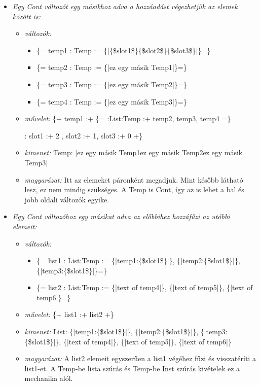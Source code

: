 {\begin{itemize}
\item \emph{ Egy Cont változót egy másikhoz adva a hozzáadást végezhetjük az elemek között is:}
\begin{itemize}
\item \emph{változók:}
\begin{itemize}
\item \{= temp1 : Temp  := \{|\{\$slot1\$\}\{\$slot2\$\}\{\$slot3\$\}|\}=\}
\item \{= temp2 : Temp  := \{|ez egy másik Temp1|\}=\}
\item \{= temp3 : Temp  := \{|ez egy másik Temp2|\}=\}
\item \{= temp4 : Temp  := \{|ez egy másik Temp3|\}=\}
\end{itemize}
\item \emph{művelet:}
\{+ temp1 :+ \{= :List:Temp :+ temp2, temp3, temp4 =\}

: slot1 :+ 2 , slot2 :+ 1, slot3 :+ 0   +\} 
\item \emph{kimenet:}
Temp: {|ez egy másik Temp1ez egy másik Temp2ez egy másik Temp3|}
\item \emph{magyarázat:}
Itt az elemeket páronként megadjuk.
Mint később látható lesz, ez nem mindig szükséges.
A Temp is Cont, így az is lehet a bal és jobb oldali változók egyike.
\end{itemize}

\item \emph{ Egy Cont változóhoz egy másikat adva az előbbihez hozzáfűzi az utóbbi elemeit:}
\begin{itemize}
\item \emph{változók:}
\begin{itemize}
\item \{= list1 : List:Temp  := \{|temp1:\{\$slot1\$\}|\}, \{|temp2:\{\$slot1\$\}|\}, \{|temp3:\{\$slot1\$\}|\}=\}
\item \{= list2 : List:Temp  := \{|text of temp4|\}, \{|text of temp5|\}, \{|text of temp6|\}=\}
\end{itemize}
\item \emph{művelet:}
\{+ list1 :+ list2 +\}
\item \emph{kimenet:}
List: \{|temp1:\{\$slot1\$\}|\}, \{|temp2:\{\$slot1\$\}|\}, \{|temp3:\{\$slot1\$\}|\}, \{|text of temp4|\}, \{|text of temp5|\}, \{|text of temp6|\}
\item \emph{magyarázat:}
A list2 elemeit egyszerűen a list1 végéhez fűzi és visszatéríti a list1-et.
A Temp-be lista szúrás és Temp-be Inst szúrás kivételek ez a mechanika alól.
\end{itemize}


\end{itemize}}
